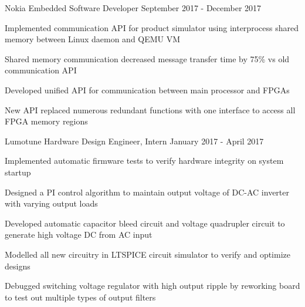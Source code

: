 \begin{cventries}
  \cventry
    {Nokia} %
    {Embedded Software Developer} %
    {September 2017 - December 2017} %
    {}
    {
      \begin{cvitems} %
        \item {Implemented communication API for product simulator using interprocess shared memory between Linux daemon and QEMU VM}
        \item {Shared memory communication decreased message transfer time by 75\% vs old communication API}
        \item {Developed unified API for communication between main processor and FPGAs}
        \item {New API replaced numerous redundant functions with one interface to access all FPGA memory regions}
      \end{cvitems}
    }

  \cventry
    {Lumotune} %
    {Hardware Design Engineer, Intern} %
    {January 2017 - April 2017} %
    {}
    {
      \begin{cvitems} %
        \item {Implemented automatic firmware tests to verify hardware integrity on system startup}
        \item {Designed a PI control algorithm to maintain output voltage of DC-AC inverter with varying output loads}
        \item {Developed automatic capacitor bleed circuit and voltage quadrupler circuit to generate high voltage DC from AC input}
        \item {Modelled all new circuitry in LTSPICE circuit simulator to verify and optimize designs}
        \item {Debugged switching voltage regulator with high output ripple by reworking board to test out multiple types of output filters}
      \end{cvitems}
    }


\end{cventries}
